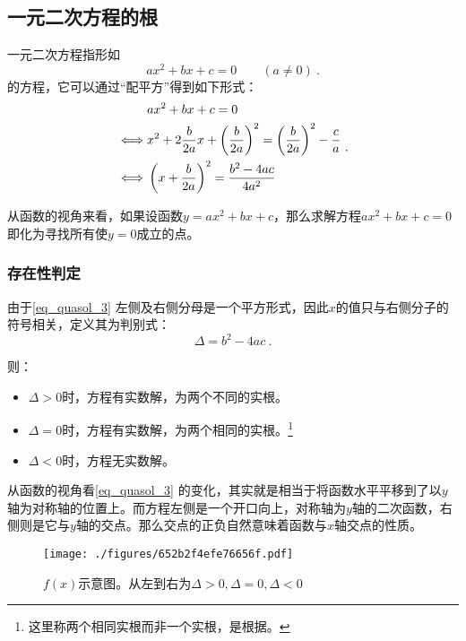 \subsection{一元二次方程的根}

一元二次方程指形如
\begin{equation}
ax^2+bx+c=0 \qquad (a\neq 0)~.
\end{equation}
的方程，它可以通过“配平方”得到如下形式：
\begin{equation}\label{eq_quasol_3}
\begin{split}
 & ax^2+bx+c = 0 \\ 
\iff&x^2+2{b\over 2a} x+\left({b\over 2a}\right)^2 = \left({b\over 2a}\right)^2-{c\over a} \\ 
\iff&\left(x+{b\over 2a}\right)^2 = {b^2-4ac\over 4a^2} \\ 
\end{split}~.
\end{equation}

从函数的视角来看，如果设函数$y=ax^2+bx+c$，那么求解方程$ax^2+bx+c=0$即化为寻找所有使$y=0$成立的点。

\subsubsection{存在性判定}

由于\autoref{eq_quasol_3} 左侧及右侧分母是一个平方形式，因此$x$的值只与右侧分子的符号相关，定义其为判别式：
\begin{equation}\label{eq_quasol_4}
\Delta = b^2-4ac~.
\end{equation}

则：
\begin{itemize}
\item $\Delta > 0$时，方程有实数解，为两个不同的实根。
\item $\Delta = 0$时，方程有实数解，为两个相同的实根。\footnote{这里称两个相同实根而非一个实根，是根据。}
\item $\Delta < 0$时，方程无实数解。
\end{itemize}

从函数的视角看\autoref{eq_quasol_3} 的变化，其实就是相当于将函数水平平移到了以$y$轴为对称轴的位置上。而方程左侧是一个开口向上，对称轴为$y$轴的二次函数，右侧则是它与$y$轴的交点。那么交点的正负自然意味着函数与$x$轴交点的性质。

\begin{figure}[ht]
\centering
\texttt{[image: ./figures/652b2f4efe76656f.pdf]}
\caption{$f(x)$示意图。从左到右为$\Delta > 0, \Delta = 0, \Delta < 0$} \label{fig_quasol_1}
\end{figure}

